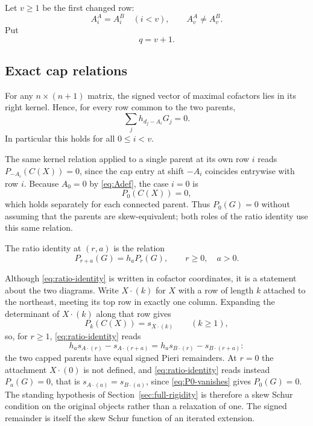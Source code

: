 \documentclass[11pt,a4paper]{amsart}
\numberwithin{equation}{section}
\theoremstyle{plain}
\theoremstyle{definition}
\begin{document}
Let \(v\ge1\) be the first changed row:
\begin{equation}\label{eq:first-change}
A_i^A=A_i^B\quad(i<v),
\qquad
A_v^A\ne A_v^B.
\end{equation}
Put
\begin{equation}\label{eq:q-def}
q=v+1.
\end{equation}

\subsection{Exact cap relations}

For any \(n\times(n+1)\) matrix, the signed vector of maximal cofactors lies in its right kernel.  Hence, for every row common to the two parents,
\begin{equation}\label{eq:common-row-relation}
\sum_j h_{d_j-A_i}G_j=0.
\end{equation}
In particular this holds for all \(0\le i<v\).

The same kernel relation applied to a single parent at its own row \(i\) reads \(P_{-A_i}(C(X))=0\),
since the cap entry at shift \(-A_i\) coincides entrywise with row \(i\).  Because \(A_0=0\) by \eqref{eq:Adef}, the case \(i=0\) is
\begin{equation}\label{eq:P0-vanishes}
P_0(C(X))=0,
\end{equation}
which holds separately for each connected parent.  Thus \(P_0(G)=0\) without assuming that the parents are skew-equivalent; both roles of the ratio identity use this same relation.

The ratio identity at \((r,a)\) is the relation
\begin{equation}\label{eq:ratio-identity}
P_{r+a}(G)=h_aP_r(G),
\qquad r\ge0,\quad a>0.
\end{equation}

Although \eqref{eq:ratio-identity} is written in cofactor coordinates, it is a statement about the two diagrams.  Write \(X\cdot(k)\) for \(X\) with a row of length \(k\) attached to the northeast, meeting its top row in exactly one column.  Expanding the determinant of \(X\cdot(k)\) along that row gives
\begin{equation}\label{eq:Pk-is-capped}
P_k(C(X))=s_{X\cdot(k)}
\qquad(k\ge1),
\end{equation}
so, for \(r\ge1\), \eqref{eq:ratio-identity} reads
\[
h_as_{A\cdot(r)}-s_{A\cdot(r+a)}
=
h_as_{B\cdot(r)}-s_{B\cdot(r+a)} :
\]
the two capped parents have equal signed Pieri remainders.  At \(r=0\) the attachment \(X\cdot(0)\) is not defined, and \eqref{eq:ratio-identity} reads instead \(P_a(G)=0\), that is \(s_{A\cdot(a)}=s_{B\cdot(a)}\), since \eqref{eq:P0-vanishes} gives \(P_0(G)=0\).  The standing hypothesis of Section~\ref{sec:full-rigidity} is therefore a skew Schur condition on the original objects rather than a relaxation of one.  The signed remainder is itself the skew Schur function of an iterated extension.
\end{document}
